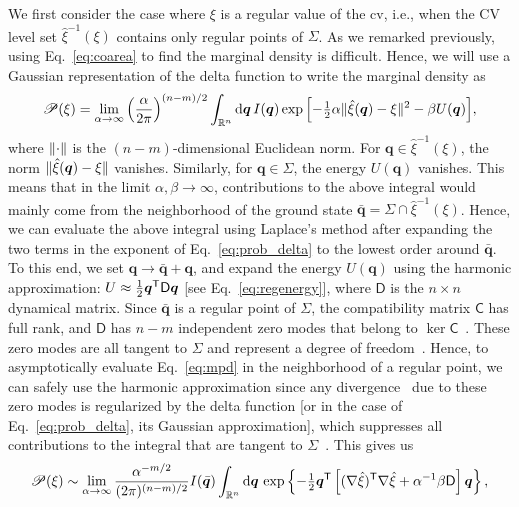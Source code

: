 We first consider the case where $\xi$ is a regular value of the \ac{cv}, i.e., when the CV level set $\hat{\xi}^{-1}(\xi)$ contains only regular points of $\Sigma$.
As we remarked previously, using Eq.~\eqref{eq:coarea} to find the marginal density is difficult.
Hence, we will use a Gaussian representation of the delta function to write the marginal density as~\cite{hartmann2007a,hartmann2011}
%
\begin{equation}
  \mathscr{P}(\xi) = \lim_{\alpha\to\infty} \left(\frac{\alpha}{2\pi}\right)^{(n-m)/2} \int_{\mathbb{R}^n} \mathrm{d} \bm{q}\, I(\bm{q}) \exp{\left[-\tfrac{1}{2}\alpha\lVert\hat{\xi}(\bm{q}) - \xi\rVert^2 - \beta U(\bm{q})\right]},
  \label{eq:prob_delta}
\end{equation}
%
where $\lVert\cdot\rVert$ is the $(n-m)$-dimensional Euclidean norm.
For $\bm{q} \in \hat{\xi}^{-1}(\xi)$, the norm $\lVert\hat{\xi}(\bm{q}) - \xi\rVert$ vanishes.
Similarly, for $\bm{q} \in \Sigma$, the energy $U(\bm{q})$ vanishes.
This means that in the limit $\alpha, \beta \to \infty$, contributions to the above integral would mainly come from the neighborhood of the ground state $\bar{\bm{q}} = \Sigma \cap \hat{\xi}^{-1}(\xi)$.
Hence, we can evaluate the above integral using Laplace's method after expanding the two terms in the exponent of Eq.~\eqref{eq:prob_delta} to the lowest order around $\bar{\bm{q}}$.
To this end, we set $\bm{q} \to \bar{\bm{q}} + \bm{q}$, and expand the energy $U(\bm{q})$ using the harmonic approximation: $U \approx \tfrac{1}{2}\bm{q}^\mathsf{T} \mathsf{D}\bm{q}$ [see Eq.~\eqref{eq:regenergy}], where $\mathsf{D}$ is the $n\times n$ dynamical matrix.
Since $\bar{\bm{q}}$ is a regular point of $\Sigma$, the compatibility matrix $\mathsf{C}$ has full rank, and $\mathsf{D}$ has $n-m$ independent zero modes that belong to $\ker\mathsf{C}$~\cite{lubensky2015}.
These zero modes are all tangent to $\Sigma$ and represent a degree of freedom~\cite{leimkuhler2005}.
Hence, to asymptotically evaluate Eq.~\eqref{eq:mpd} in the neighborhood of a regular point, we can safely use the harmonic approximation since any divergence~\cite{schwarz1979,ellis1981,rocklin2018} due to these zero modes is regularized by the delta function [or in the case of Eq.~\eqref{eq:prob_delta}, its Gaussian approximation], which suppresses all contributions to the integral that are tangent to $\Sigma$~\cite{ramond1997}.
This gives us
%
\begin{equation}
  \mathscr{P}(\xi) \sim \lim_{\alpha\to\infty} \frac{\alpha^{-m/2}}{(2\pi)^{(n-m)/2}}I(\bar{\bm{q}})\int_{\mathbb{R}^n} \mathrm{d}{\bm{q}}\, \exp\left\{-\tfrac{1}{2}\bm{q}^\mathsf{T}\left[(\nabla\hat{\xi})^\mathsf{T}\nabla\hat{\xi} + \alpha^{-1}\beta \mathsf{D}\right]\bm{q}\right\},
  \label{eq:prob_gaussian}
\end{equation}
